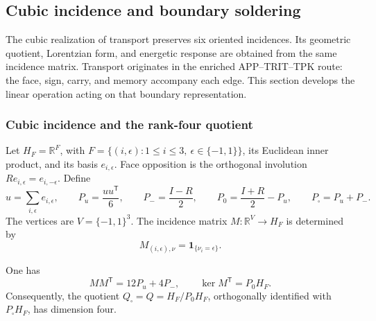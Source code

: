 
\subsection{Cubic incidence and boundary soldering}
\label{vii:sec:pantalla-respuesta}

The cubic realization of transport preserves six oriented incidences.
Its geometric quotient, Lorentzian form, and energetic response
are obtained from the same incidence matrix. Transport originates in
the enriched APP--TRIT--TPK route: the face, sign, carry, and
memory accompany each edge. This section develops the
linear operation acting on that boundary representation.

\subsubsection{Cubic incidence and the rank-four quotient}
\label{vii:sec:cociente-pantalla}

Let \(H_F=\mathbb R^F\), with
\(F=\{(i,\epsilon):1\leq i\leq3,\ \epsilon\in\{-1,1\}\}\),
its Euclidean inner product, and its basis \(e_{i,\epsilon}\).
Face opposition is the orthogonal involution
\(Re_{i,\epsilon}=e_{i,-\epsilon}\). Define
\[
 u=\sum_{i,\epsilon}e_{i,\epsilon},\qquad
 P_u=\frac{uu^{\mathsf T}}6,\qquad P_-=\frac{I-R}{2},\qquad
 P_0=\frac{I+R}{2}-P_u,\qquad P_\square=P_u+P_-.
\]
The vertices are \(V=\{-1,1\}^3\). The incidence matrix
\(M:\mathbb R^V\longrightarrow H_F\) is determined by
\[
 M_{(i,\epsilon),\nu}=\mathbf1_{\{\nu_i=\epsilon\}}.
\]

\begin{proposition}
\label{vii:prop:incidencia}
One has
\[
 MM^{\mathsf T}=12P_u+4P_-,
 \qquad
 \ker M^{\mathsf T}=P_0H_F.
\]
Consequently, the quotient
\(Q_\square=Q=H_F/P_0H_F\), orthogonally identified with
\(P_\square H_F\), has dimension four.
\end{proposition}

